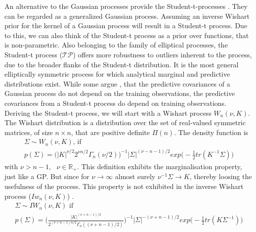 An alternative to the Gaussian processes provide the Student-t-processes \cite{Shah_14}. They can be regarded as a generalized Gaussian process. Assuming an inverse Wishart prior for the kernel of a Gaussian process will result in a Student-t process. Due to this, we can also think of the Student-t process as a prior over functions, that is non-parametric. Also belonging to the family of elliptical processes, the Student-t process ($\mathcal{TP}$) offers more robustness to outliers inherent to the process, due to the broader flanks of the Student-t distribution. It is the most general elliptically symmetric process for which analytical marginal and predictive distributions exist. While some argue \cite{Shah_14}, that the predictive covariances of a Gaussian process do not depend on the training observations, the predictive covariances from a Student-t process do depend on training observations. Deriving the Student-t process, we will start with a Wishart process $W_n(\nu,K)$. The Wishart distribution is a distribution over the set of real-valued symmetric matrices, of size $n\times n$, that are positive definite $\Pi(n)$. The density function is
\begin{subequations}%
	\label{eq:}
	\begin{align}
	\Sigma \sim W_n(\nu,K) \text{, if }         \label{eq:Wishart Distribution} \\
	p(\Sigma) = \Big(|K|^{\nu/2}2^{\nu n/2} \Gamma_n(\nu/2)\Big)^{-1}|\Sigma|^{(\nu-n-1)/2} exp \Big(-\frac{1}{2}tr(K^{-1}\Sigma)\Big)         \label{eq:Wishart distribution definition}
	\end{align}
\end{subequations}
with $\nu > n-1,\text{ } \nu \in \mathbb{R}_+$. This definition exhibits the marginalisation property, just like a GP. But since for $\nu \to \infty$ almost surely $\nu^{-1}\Sigma \to K$, thereby loosing the usefulness of the process. This property is not exhibited in the inverse Wishart process ($Iw_n(\nu, K)$) \cite{Dawid_1981}.
\begin{subequations}%
	\label{eq:}
	\begin{align}
	\Sigma \sim IW_n(\nu,K) \text{ if }         \label{eq:Inverse Wishart distribution} \\
	p(\Sigma) = \Big(\frac{|K|^{(\nu+n-1)/2}}{2^{(\nu+n-1)n/2}\Gamma_n((\nu+n-1)/2)}\Big)^{-1}|\Sigma|^{-(\nu+n-1)/2} exp \Big(-\frac{1}{2}tr(K\Sigma^{-1})\Big)         \label{eq:Inverse Wishart distribution definition}
	\end{align}
\end{subequations}
